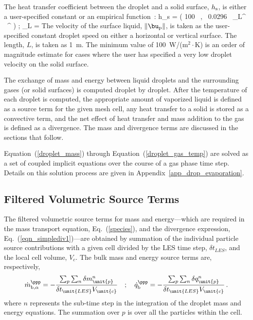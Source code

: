 The heat transfer coefficient between the droplet and a solid surface, $h_{\rm s}$, is either a user-specified constant or an empirical function~\cite{Incropera:1}:
\be
   h_{\rm s} = \max \left( 100 \, , \, 0.0296 \, \RE_L^{} \, \PR^\ot \;  \right)  \quad ; \quad \RE_L = 
\ee
The velocity of the surface liquid, $\| \bu_{\rm p} \|$, is taken as the user-specified constant droplet speed on either a horizontal or vertical surface. The length, $L$, is taken as 1~m. The minimum value of 100~W/(m$^2 \cdot$K) is an order of magnitude estimate for cases where the user has specified a very low droplet velocity on the solid surface.

The exchange of mass and energy between liquid droplets and the surrounding gases (or solid surfaces) is computed droplet by droplet. After the temperature of each droplet is computed, the
appropriate amount of vaporized liquid is defined as a source term for the given mesh cell, any heat transfer to a solid is stored as a convective term, and the net effect of heat transfer and mass addition to the gas is defined as a divergence. The mass and divergence terms are discussed in the sections that follow.

Equation~(\ref{droplet_mass}) through Equation~(\ref{droplet_gas_temp}) are solved as a set of coupled implicit equations over the course of a gas phase time step. Details on this solution process are given in Appendix~\ref{app_drop_evaporation}.

\subsection{Filtered Volumetric Source Terms}

The filtered volumetric source terms for mass and energy---which are required in the mass transport equation, Eq.~(\ref{species}), and the divergence expression, Eq.~(\ref{eqn_simplediv1})---are obtained by summation of the individual particle source contributions with a given cell divided by the LES time step, $\delta t_{\unit{LES}}$, and the local cell volume, $V_{\unit{c}}$. The bulk mass and energy source terms are, respectively,
\begin{equation}
\label{eq:bulk_source}
\dot{m}_{{\rm b},\alpha}^{\ppp} = - \frac{ \sum_p \sum_n \delta m_{\unit{p}}^n }{\delta t_{\unit{LES}} V_{\unit{c}}} \quad ; \quad
\dot{q}_{\rm b}^{\ppp} = - \frac{ \sum_p \sum_n \delta q_{\unit{p}}^n }{\delta t_{\unit{LES}} V_{\unit{c}}} \,\mbox{.}
\end{equation}
where $n$ represents the sub-time step in the integration of the droplet mass and energy equations.  The summation over $p$ is over all the particles within the cell.


